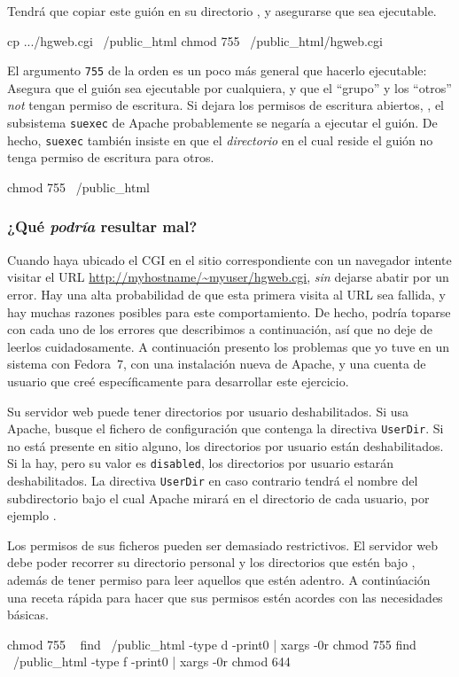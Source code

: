 Tendrá que copiar este guión en su directorio ,
y asegurarse que sea ejecutable.
\begin{codesample2}
  cp .../hgweb.cgi ~/public_html
  chmod 755 ~/public_html/hgweb.cgi
\end{codesample2}
El argumento \texttt{755} de la orden  es un poco más
general que hacerlo ejecutable: Asegura que el guión sea ejecutable
por cualquiera, y que el ``grupo'' y los ``otros'' \emph{not}  tengan
permiso de escritura.  Si dejara los permisos de escritura abiertos,
, el subsistema \texttt{suexec} de  Apache probablemente se negaría
a ejecutar el guión.  De hecho, \texttt{suexec} también insiste en que
el \emph{directorio} en el cual reside el guión no tenga permiso de
escritura para otros.
\begin{codesample2}
  chmod 755 ~/public_html
\end{codesample2}

\subsubsection{¿Qué \emph{podría} resultar mal?}
\label{sec:collab:wtf}

Cuando haya ubicado el CGI en el sitio correspondiente con un navegador
intente visitar el URL \url{http://myhostname/~myuser/hgweb.cgi},
\emph{sin} dejarse abatir por un error.  Hay una alta probabilidad de
que esta primera visita al URL sea fallida, y hay muchas razones posibles
para este comportamiento.  De hecho, podría toparse con cada uno de los
errores que describimos a continuación, así que no deje de leerlos
cuidadosamente.   A continuación presento los problemas que yo tuve en
un sistema con Fedora~7, con una instalación nueva de Apache, y una
cuenta de usuario que creé específicamente para desarrollar este
ejercicio.

Su servidor web puede tener directorios por usuario deshabilitados. Si
usa Apache, busque el fichero de configuración que contenga la
directiva \texttt{UserDir}.  Si no está presente en sitio alguno, los
directorios por usuario están deshabilitados.  Si la hay, pero su
valor es \texttt{disabled}, los directorios por usuario estarán
deshabilitados. La directiva \texttt{UserDir} en caso contrario tendrá
el nombre del subdirectorio bajo el cual Apache mirará en el
directorio de cada usuario, por ejemplo .

Los permisos de sus ficheros pueden ser demasiado restrictivos.  El
servidor web debe poder recorrer su directorio personal y los
directorios que estén bajo , además de tener
permiso para leer aquellos que estén adentro.  A continúación una
receta rápida para hacer que sus permisos estén acordes con las
necesidades básicas.
\begin{codesample2}
  chmod 755 ~
  find ~/public_html -type d -print0 | xargs -0r chmod 755
  find ~/public_html -type f -print0 | xargs -0r chmod 644
\end{codesample2}

